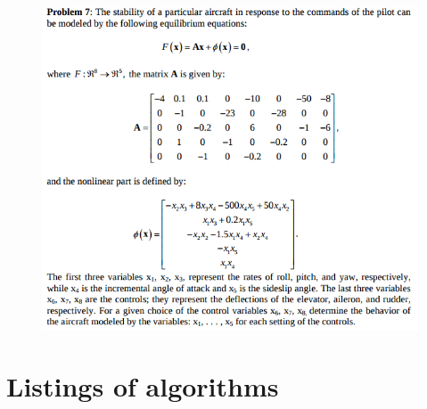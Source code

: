 \documentclass[eng,openany]{mgr}
\begin{document}
\clearpage
\begin{figure}[h]
	\centering
	\includegraphics[width=0.7\linewidth]{screenshot011}
	\label{fig:screenshot010}
\end{figure}









\clearpage
\chapter{Listings of algorithms}
\end{document}
